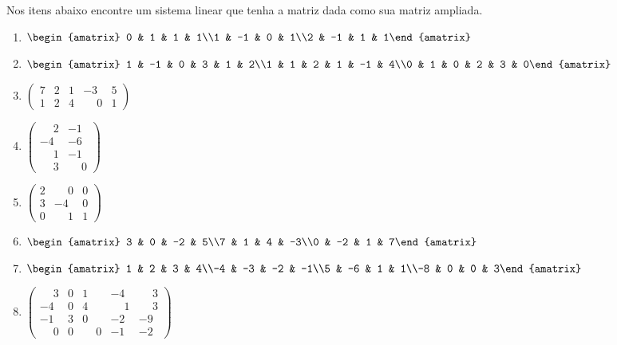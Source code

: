 \documentclass[12pt]{exam}
\begin{document}
\begin{exercicio}
  Nos itens abaixo encontre um sistema linear que tenha a matriz dada como sua matriz ampliada.
  \begin{multicols}{2}
    \begin{enumerate}[label={\alph*})]
      \item $\begin{amatrix}{3}0 & 1 & 1 & 1\\1 & -1 & 0 & 1\\2 & -1 & 1 & 1\end{amatrix}$
      \item $\begin{amatrix}{5}1 & -1 & 0 & 3 & 1 & 2\\1 & 1 & 2 & 1 & -1 & 4\\0 & 1 & 0 & 2 & 3 & 0\end{amatrix}$
      \item $\begin{pmatrix}7 & 2 & 1 & -3 & 5\\1 & 2 & 4 & \phantom{-} 0 & 1\end{pmatrix}$
      \item $\begin{pmatrix}\phantom{-} 2 & -1 \\ -4 & -6\\ \phantom{-} 1 & -1\\\phantom{-} 3 & \phantom{-} 0\end{pmatrix}$
      \item $\begin{pmatrix}2 & \phantom{-} 0 & 0\\3 & -4 &0\\0 & \phantom{-} 1 & 1\end{pmatrix}$
      \item $\begin{amatrix}{3}3 & 0 & -2 & 5\\7 & 1 & 4 & -3\\0 & -2 & 1 & 7\end{amatrix}$
      \item $\begin{amatrix}{3}1 & 2 & 3 & 4\\-4 & -3 & -2 & -1\\5 & -6 & 1 & 1\\-8 & 0 & 0 & 3\end{amatrix}$
      \item $\begin{pmatrix}\phantom{-} 3 & 0 & 1 & -4 & \phantom{-} 3\\-4 & 0 & 4 & \phantom{-} 1 & \phantom{-} 3\\-1 & 3 & 0 & -2 & -9\\\phantom{-} 0 & 0 & \phantom{-} 0 & -1 & -2\end{pmatrix}$
    \end{enumerate}
  \end{multicols}
\end{exercicio}
\end{document}
